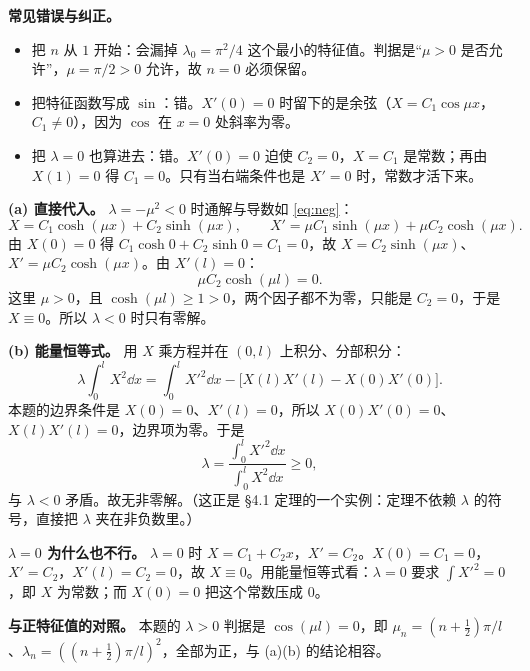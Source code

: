 \documentclass[11pt]{ctexart}
\begin{document}

\textbf{常见错误与纠正。}
\begin{itemize}
  \item 把 $n$ 从 $1$ 开始：会漏掉 $\lambda_0=\pi^2/4$ 这个最小的特征值。判据是“$\mu>0$ 是否允许”，$\mu=\pi/2>0$ 允许，故 $n=0$ 必须保留。
  \item 把特征函数写成 $\sin$：错。$X'(0)=0$ 时留下的是余弦（$X=C_1\cos\mu x$，$C_1\ne0$），因为 $\cos$ 在 $x=0$ 处斜率为零。
  \item 把 $\lambda=0$ 也算进去：错。$X'(0)=0$ 迫使 $C_2=0$，$X=C_1$ 是常数；再由 $X(1)=0$ 得 $C_1=0$。只有当右端条件也是 $X'=0$ 时，常数才活下来。
\end{itemize}



\textbf{(a) 直接代入。} $\lambda=-\mu^2<0$ 时通解与导数如 \eqref{eq:neg}：
\[
X=C_1\cosh(\mu x)+C_2\sinh(\mu x),\qquad
X'=\mu C_1\sinh(\mu x)+\mu C_2\cosh(\mu x).
\]
由 $X(0)=0$ 得 $C_1\cosh0+C_2\sinh0=C_1=0$，故 $X=C_2\sinh(\mu x)$、$X'=\mu C_2\cosh(\mu x)$。由 $X'(l)=0$：
\[
\mu C_2\cosh(\mu l)=0 .
\]
这里 $\mu>0$，且 $\cosh(\mu l)\ge1>0$，两个因子都不为零，只能是 $C_2=0$，于是 $X\equiv0$。所以 $\lambda<0$ 时只有零解。

\textbf{(b) 能量恒等式。} 用 $X$ 乘方程并在 $(0,l)$ 上积分、分部积分：
\[
\lambda\int_0^lX^2\dd x=\int_0^lX'^2\dd x-\Big[X(l)X'(l)-X(0)X'(0)\Big].
\]
本题的边界条件是 $X(0)=0$、$X'(l)=0$，所以 $X(0)X'(0)=0$、$X(l)X'(l)=0$，边界项为零。于是
\[
\lambda=\frac{\int_0^lX'^2\dd x}{\int_0^lX^2\dd x}\ge0,
\]
与 $\lambda<0$ 矛盾。故无非零解。（这正是 §4.1 定理的一个实例：定理不依赖 $\lambda$ 的符号，直接把 $\lambda$ 夹在非负数里。）

\textbf{$\lambda=0$ 为什么也不行。} $\lambda=0$ 时 $X=C_1+C_2x$，$X'=C_2$。$X(0)=C_1=0$，$X'=C_2$，$X'(l)=C_2=0$，故 $X\equiv0$。用能量恒等式看：$\lambda=0$ 要求 $\int X'^2=0$，即 $X$ 为常数；而 $X(0)=0$ 把这个常数压成 $0$。


\textbf{与正特征值的对照。} 本题的 $\lambda>0$ 判据是 $\cos(\mu l)=0$，即 $\mu_n=(n+\frac12)\pi/l$、$\lambda_n=((n+\frac12)\pi/l)^2$，全部为正，与 (a)(b) 的结论相容。
\end{document}
